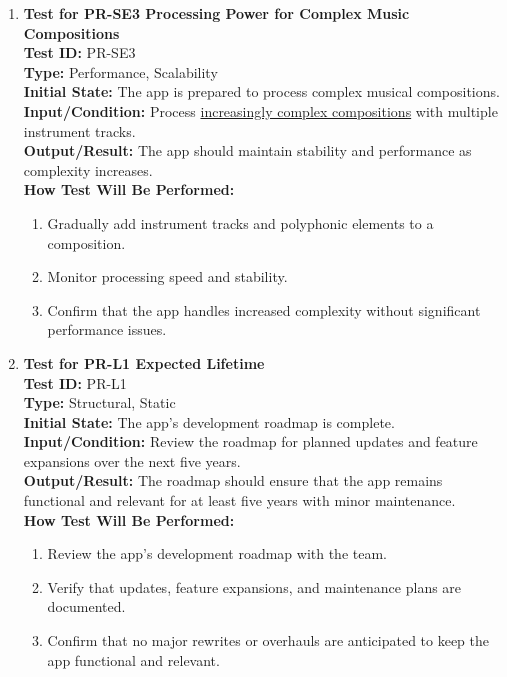 \documentclass[12pt, titlepage]{article}
\begin{document}
\begin{enumerate}
    \item \textbf{Test for PR-SE3 Processing Power for Complex Music Compositions} \\
      \newline
      \textbf{Test ID:} PR-SE3 \\
      \textbf{Type:} Performance, Scalability \\
      \textbf{Initial State:} The app is prepared to process complex musical compositions. \\
      \textbf{Input/Condition:} Process \href{https://github.com/JaakLipp/ScoreGen/tree/main/test/TestingDatasets/piano-samples/sample-chords}{increasingly complex compositions} with multiple instrument tracks. \\
      \textbf{Output/Result:} The app should maintain stability and performance as complexity increases. \\
      \textbf{How Test Will Be Performed:}
      \begin{enumerate}
          \item Gradually add instrument tracks and polyphonic elements to a composition.
          \item Monitor processing speed and stability.
          \item Confirm that the app handles increased complexity without significant performance issues.
      \end{enumerate}

    \item \textbf{Test for PR-L1 Expected Lifetime} \\
      \newline
      \textbf{Test ID:} PR-L1 \\
      \textbf{Type:} Structural, Static \\
      \textbf{Initial State:} The app’s development roadmap is complete. \\
      \textbf{Input/Condition:} Review the roadmap for planned updates and feature expansions over the next five years. \\
      \textbf{Output/Result:} The roadmap should ensure that the app remains functional and relevant for at least five years with minor maintenance. \\
      \textbf{How Test Will Be Performed:}
      \begin{enumerate}
          \item Review the app’s development roadmap with the team.
          \item Verify that updates, feature expansions, and maintenance plans are documented.
          \item Confirm that no major rewrites or overhauls are anticipated to keep the app functional and relevant.
      \end{enumerate}
\end{enumerate}
\end{document}

